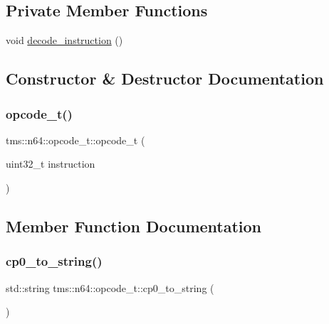 \subsection*{Private Member Functions}
\begin{DoxyCompactItemize}
\item 
void \hyperlink{classtms_1_1n64_1_1opcode__t_a4a6f6095d754498430110c12b07fa169}{decode\+\_\+instruction} ()
\end{DoxyCompactItemize}


\subsection{Constructor \& Destructor Documentation}
\mbox{\label{classtms_1_1n64_1_1opcode__t_a507801bea9f0304881b0df6ab06778a8}} 
\subsubsection{\texorpdfstring{opcode\+\_\+t()}{opcode\_t()}}
{\footnotesize\ttfamily tms\+::n64\+::opcode\+\_\+t\+::opcode\+\_\+t (\begin{DoxyParamCaption}\item[{uint32\+\_\+t}]{instruction }\end{DoxyParamCaption})}



\subsection{Member Function Documentation}
\mbox{\label{classtms_1_1n64_1_1opcode__t_a2700aae8c42f277c7c5f63639753faae}} 
\subsubsection{\texorpdfstring{cp0\+\_\+to\+\_\+string()}{cp0\_to\_string()}}
{\footnotesize\ttfamily std\+::string tms\+::n64\+::opcode\+\_\+t\+::cp0\+\_\+to\+\_\+string (\begin{DoxyParamCaption}{ }\end{DoxyParamCaption})}

